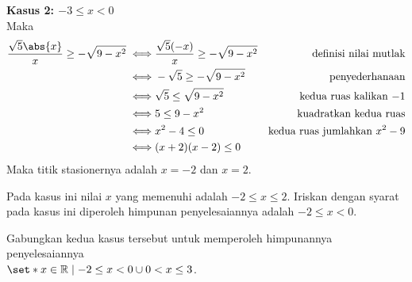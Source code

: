 \begin{enumerate}[leftmargin=*, label={\arabic*}.]
\begin{enumerate}[label={\alph*}.]
    \textbf{Kasus 2: $-3 \leq x < 0$}\\
    Maka
    \begin{align*}
        \frac{\sqrt{5}\abs{x}}{x} \geq -\sqrt{9-x^{2}}
        \iff &\frac{\sqrt{5}(-x)}{x} \geq -\sqrt{9-x^{2}} 
        &\text{definisi nilai mutlak} \\
        \iff &-\sqrt{5} \geq -\sqrt{9-x^{2}}
        &\text{penyederhanaan}\\
        \iff &\sqrt{5} \leq \sqrt{9-x^{2}}
        &\text{kedua ruas kalikan $-1$}\\
        \iff & 5 \leq 9-x^{2}
        &\text{kuadratkan kedua ruas}\\
        \iff &x^{2}-4 \leq 0
        &\text{kedua ruas jumlahkan $x^{2}-9$}\\
        \iff &(x+2)(x-2) \leq 0
    \end{align*}
    Maka titik stasionernya adalah $x=-2$ dan $x=2$.
    \begin{center}
        \end{center}
    Pada kasus ini nilai $x$ yang memenuhi adalah $-2 \leq x \leq 2$. Iriskan dengan syarat 
    pada kasus ini diperoleh himpunan penyelesaiannya adalah $-2 \leq x < 0$.

    Gabungkan kedua kasus tersebut untuk memperoleh himpunannya penyelesaiannya \\
    $\set*{x \in \mathbb{R} \mid -2 \leq x < 0 \cup 0 < x \leq 3}$.


\end{enumerate}
\end{enumerate}
